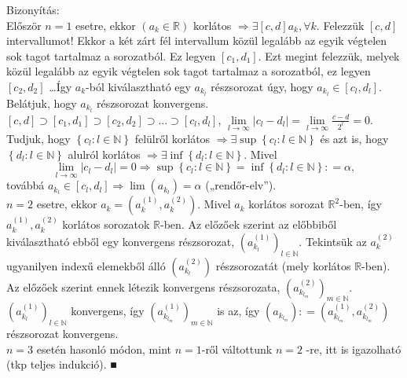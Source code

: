 \documentclass[]{scrartcl}
\newenvironment{bizonyitas}{}{}
\begin{document}
\begin{bizonyitas}

Bizonyítás:\\
Először \(n = 1\) esetre, ekkor
\(\left( {a_{k} \in {\mathbb{R}}} \right)\) korlátos
\(\left. \Rightarrow\exists\left\lbrack {c,d} \right\rbrack a_{k},\forall k \right.\).
Felezzük \(\left\lbrack {c,d} \right\rbrack\) intervallumot! Ekkor a két
zárt fél intervallum közül legalább az egyik végtelen sok tagot
tartalmaz a sorozatból. Ez legyen
\(\left\lbrack {c_{1},d_{1}} \right\rbrack\). Ezt megint felezzük,
melyek közül legalább az egyik végtelen sok tagot tartalmaz a
sorozatból, ez legyen \(\left\lbrack {c_{2},d_{2}} \right\rbrack\)
\ldots{}Így \(a_{k}\)-ból kiválasztható egy \(a_{k_{l}}\) részsorozat
úgy, hogy \(a_{k_{l}} \in \left\lbrack {c_{l},d_{l}} \right\rbrack\).
Belátjuk, hogy \(a_{k_{l}}\) részsorozat konvergens.\\
\(\left\lbrack {c,d} \right\rbrack \supset \left\lbrack {c_{1},d_{1}} \right\rbrack \supset \left\lbrack {c_{2},d_{2}} \right\rbrack \supset ... \supset \left\lbrack {c_{l},d_{l}} \right\rbrack\),
\(\underset{l\rightarrow\infty}{\lim}\left| {c_{l} - d_{l}} \right| = \underset{l\rightarrow\infty}{\lim}\frac{c - d}{2^{l}} = 0\).
Tudjuk, hogy \(\left\{ {c_{l}:l \in {\mathbb{N}}} \right\}\) felülről
korlátos
\(\left. \Rightarrow\exists\sup\left\{ {c_{l}:l \in {\mathbb{N}}} \right\} \right.\)
és azt is, hogy \(\left\{ {d_{l}:l \in {\mathbb{N}}} \right\}\) alulról
korlátos
\(\left. \Rightarrow\exists\inf\left\{ {d_{l}:l \in {\mathbb{N}}} \right\} \right.\).
Mivel
\[\left. \underset{l\rightarrow\infty}{\lim}\left| {c_{l} - d_{l}} \right| = 0\Rightarrow\sup\left\{ {c_{l}:l \in {\mathbb{N}}} \right\} = \inf\left\{ {d_{l}:l \in {\mathbb{N}}} \right\}: = \alpha \right.,\]
továbbá
\(\left. a_{k_{l}} \in \left\lbrack {c_{l},d_{l}} \right\rbrack\Rightarrow\lim\left( a_{k_{l}} \right) = \alpha \right.\)
(„rendőr-elv'').\\
\(n = 2\) esetre, ekkor
\(a_{k} = \left( {a_{k}^{(1)},a_{k}^{(2)}} \right)\). Mivel \(a_{k}\)
korlátos sorozat \({\mathbb{R}}^{2}\)-ben, így
\(a_{k}^{(1)},a_{k}^{(2)}\) korlátos sorozatok \(\mathbb{R}\)-ben. Az
előzőek szerint az előbbiből kiválasztható ebből egy konvergens
részsorozat, \(\left( a_{k_{l}}^{(1)} \right)_{l \in {\mathbb{N}}}\).
Tekintsük az \(a_{k}^{(2)}\) ugyanilyen indexű elemekből álló
\(\left( a_{k_{l}}^{(2)} \right)\) részsorozatát (mely korlátos
\(\mathbb{R}\)-ben). Az előzőek szerint ennek létezik konvergens
részsorozata,
\(\left( a_{k_{l_{m}}}^{(2)} \right)_{m \in {\mathbb{N}}}\).
\(\left( a_{k_{l}}^{(1)} \right)_{l \in {\mathbb{N}}}\) konvergens, így
\(\left( a_{k_{l_{m}}}^{(1)} \right)_{m \in {\mathbb{N}}}\) is az, így
\(\left( a_{k_{l_{m}}} \right): = \left( {a_{k_{l_{m}}}^{(1)},a_{k_{l_{m}}}^{(2)}} \right)\)
részsorozat konvergens.\\
\(n = 3\) esetén hasonló módon, mint \(n = 1\)-ről váltottunk \(n = 2\)
-re, itt is igazolható (tkp teljes indukció). ■

\end{bizonyitas}
\end{document}
